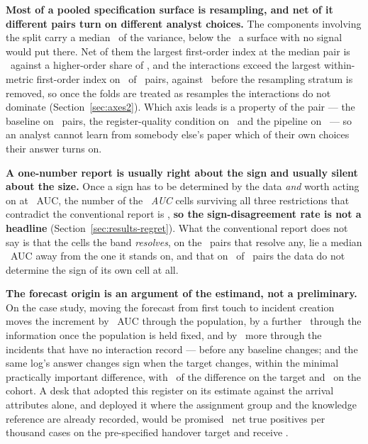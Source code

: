 \textbf{Most of a pooled specification surface is resampling, and net of it
different pairs turn on different analyst choices.} The components involving
the split carry a median \shareResamplingStratumPct\ of the variance, below
the \splitNullShareMaxPct\ a surface with no signal would put there. Net of
them the largest first-order index at the median pair is
\foldLargestFirstOrderPct\ against a higher-order share of
\foldInteractionTotalPct, and the interactions exceed the largest
within-metric first-order index on \nFoldInteractionExceeds\ of \nPairs\
pairs, against \nPooledInteractionExceeds\ before the resampling stratum is
removed, so once the folds are treated as resamples the interactions do not
dominate (Section~\ref{sec:axes2}). Which axis leads is a
property of the pair --- the baseline on \nFoldLeadPairsRung\ pairs, the
register-quality condition on \nFoldLeadPairsQuality\ and the pipeline on
\nFoldLeadPairsPipeline\ --- so an analyst cannot learn from somebody else's
paper which of their own choices their answer turns on.

\textbf{A one-number report is usually right about the sign and usually silent
about the size.} Once a sign has to be determined by the data \emph{and} worth
acting on at \mpidAuc\ AUC, the number of the \nCellsFullyRestricted\
\emph{AUC} cells surviving all three restrictions that contradict the
conventional report is \nDisagreeFullyRestricted{}, \textbf{so the
sign-disagreement rate is not a headline} (Section~\ref{sec:results-regret}).
What the conventional report does not say is that the cells the band
\emph{resolves}, on the \nPairsMadResolved\ pairs that resolve any, lie a
median \madResolvedMedian\ AUC away from the one it
stands on, and that on \nRefUnresolvedCell\ of \nPairs\ pairs the data do not
determine the sign of its own cell at all.

\textbf{The forecast origin is an argument of the estimand, not a preliminary.}
On the case study, moving the forecast from first touch to incident creation
moves the increment by \deltaCohortAtTau\ AUC through the population, by a
further \deltaSnapshotAtTau\ through the information once the population is
held fixed, and by \deltaPopulationResidual\ more through the incidents that
have no interaction record --- before any baseline changes; and the same
log's answer changes sign when the target changes, within the minimal
practically important difference, with \shareTargetPct\ of the difference on
the target and \shareCohortPct\ on the cohort. A desk that
adopted this register on its estimate against the arrival attributes alone,
and deployed it where the assignment group and the knowledge reference are
already recorded, would be promised \promisedPerThousand\ net true positives
per thousand cases on the pre-specified handover target and receive
\deliveredPerThousand.

